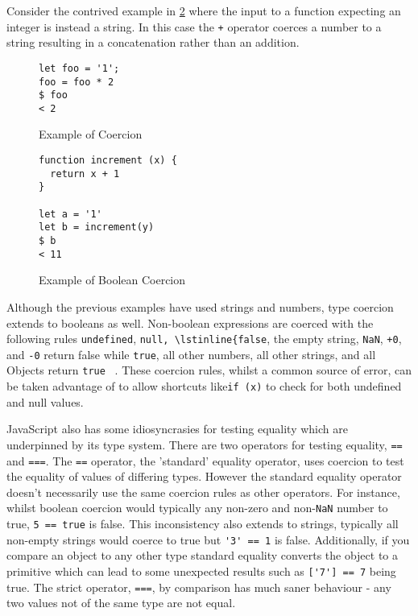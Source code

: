 \documentclass[]{final_report}
\begin{document}
Consider the contrived example in \ref{fig:js-bool-coercion} where the input to a function expecting an integer is instead a string. In this case the \lstinline{+} operator coerces a number to a string resulting in a concatenation rather than an addition.

\begin{figure}[h]
\begin{verbatim}
let foo = '1';
foo = foo * 2
$ foo
< 2
\end{verbatim}
\caption{\label{fig:js-coercion} Example of Coercion}
\end{figure} 

\begin{figure}[h]
\begin{verbatim}
function increment (x) {
  return x + 1
}

let a = '1'
let b = increment(y)
$ b
< 11
\end{verbatim}
\caption{\label{fig:js-bool-coercion} Example of Boolean Coercion}
\end{figure} 

Although the previous examples have used strings and numbers, type coercion extends to booleans as well. Non-boolean expressions are coerced with the following rules \lstinline{undefined}, \lstinline{null, \lstinline{false}, the empty string, \lstinline{NaN}, \lstinline{+0}, and \lstinline{-0}  return false while \lstinline{true}, all other numbers, all other strings, and all Objects return \lstinline{true} ~\cite{EcmaScript}. These coercion rules, whilst a common source of error, can be taken advantage of to allow shortcuts like\lstinline{if (x)} to check for both undefined and null values.

JavaScript also has some idiosyncrasies for testing equality which are underpinned by its type system. There are two operators for testing equality, \lstinline{==} and \lstinline{===}.  The \lstinline{==} operator, the 'standard' equality operator, uses coercion to test the equality of values of differing types. However the standard equality operator doesn't necessarily use the same coercion rules as other operators. For instance, whilst boolean coercion would typically any non-zero and non-\lstinline{NaN} number to true,  \lstinline{5 == true} is false. This inconsistency also extends to strings, typically all non-empty strings would coerce to true but \lstinline{'3' == 1} is false. Additionally, if you compare an object to any other type standard equality converts the object to a primitive which can lead to some unexpected results such as \lstinline{['7'] == 7}  being true. The strict operator, \lstinline{===}, by comparison has much saner behaviour - any two values not of the same type are not equal.
\end{document}
